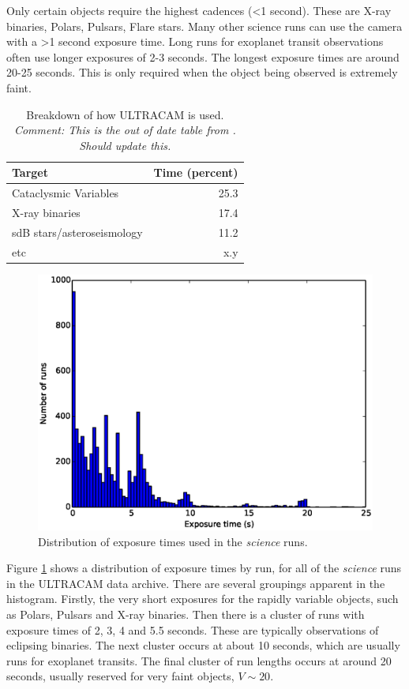 Only certain objects require the highest cadences (\textless 1 second). These are X-ray binaries, Polars, Pulsars, Flare stars. Many other science runs can use the camera with a \textgreater 1 second exposure time. Long runs for exoplanet transit observations often use longer exposures of 2-3 seconds. The longest exposure times are around 20-25 seconds. This is only required when the object being observed is extremely faint.  

\begin{table}
  \begin{center}
	\begin{tabular}{|l|r|}
		\hline
		Target & Time (percent) \\
		\hline
		Cataclysmic Variables & 25.3 \\
		X-ray binaries & 17.4 \\
		sdB stars/asteroseismology & 11.2 \\
		etc & x.y \\
		\hline
	\end{tabular}
  \end{center}
\label{tab:breakdown}
\caption{Breakdown of how ULTRACAM is used. \emph{Comment: This is the out of date table from \cite{dhillon07}. Should update this.}}
\end{table}


\begin{figure}[!h]
  \centering
  \includegraphics[width=120mm]{images/cadences_hist0-25.eps}
  \caption{Distribution of exposure times used in the \emph{science} runs.}
  \label{fig:cadences}
\end{figure}

Figure \ref{fig:cadences} shows a distribution of exposure times by run, for all of the \emph{science} runs in the ULTRACAM data archive. There are several groupings apparent in the histogram. Firstly, the very short exposures for the rapidly variable objects, such as Polars, Pulsars and X-ray binaries. Then there is a cluster of runs with exposure times of 2, 3, 4 and 5.5 seconds. These are typically observations of eclipsing binaries. The next cluster occurs at about 10 seconds, which are usually runs for exoplanet transits. The final cluster of run lengths occurs at around 20 seconds, usually reserved for very faint objects, $V\sim 20$.

